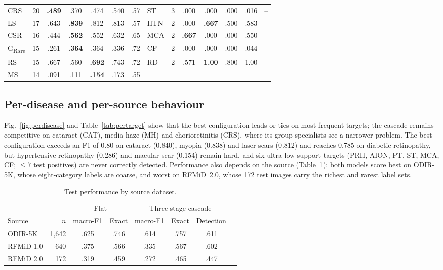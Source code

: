 \documentclass[conference]{IEEEtran}
\newcommand{\B}[1]{\textbf{#1}}
\newcommand{\grare}{G\textsubscript{Rare}}
\begin{document}
\begin{table}[t]
\begin{tabular}{@{}lrccccc|lrccccc@{}}
CRS & 20 & \B{.489} & .370 & .474 & .540 & .57 & ST & 3 & .000 & .000 & .000 & .016 & --\\
LS & 17 & .643 & \B{.839} & .812 & .813 & .57 & HTN & 2 & .000 & \B{.667} & .500 & .583 & --\\
CSR & 16 & .444 & \B{.562} & .552 & .632 & .65 & MCA & 2 & \B{.667} & .000 & .000 & .550 & --\\
\grare{} & 15 & .261 & \B{.364} & .364 & .336 & .72 & CF & 2 & .000 & .000 & .000 & .044 & --\\
RS & 15 & .667 & .560 & \B{.692} & .743 & .72 & RD & 2 & .571 & \B{1.00} & .800 & 1.00 & --\\
MS & 14 & .091 & .111 & \B{.154} & .173 & .55 & & & & & & &\\
\bottomrule
\end{tabular}
\end{table}

\subsection{Per-disease and per-source behaviour}
Fig.~\ref{fig:perdisease} and Table~\ref{tab:pertarget} show that the best configuration leads or ties on most
frequent targets; the cascade remains competitive on cataract (CAT), media haze (MH)
and chorioretinitis (CRS), where its group specialists see a narrower problem.
The best configuration exceeds an F1 of 0.80 on cataract (0.840), myopia (0.838) and
laser scars (0.812) and reaches 0.785 on diabetic retinopathy, but hypertensive
retinopathy (0.286) and macular scar (0.154) remain hard, and six ultra-low-support
targets (PRH, AION, PT, ST, MCA, CF; $\leq 7$ test positives) are never correctly detected.
Performance also depends on the source (Table~\ref{tab:source}): both models
score best on ODIR-5K, whose eight-category labels are coarse, and worst on
RFMiD~2.0, whose 172 test images carry the richest and rarest label sets.

\begin{table}[t]
\centering
\caption{Test performance by source dataset.}
\label{tab:source}
\setlength{\tabcolsep}{3.2pt}
\footnotesize
\begin{tabular}{@{}lrcccccc@{}}
\toprule
& & \multicolumn{2}{c}{Flat} & \multicolumn{3}{c}{Three-stage cascade}\\
\cmidrule(lr){3-4}\cmidrule(l){5-7}
Source & $n$ & macro-F1 & Exact & macro-F1 & Exact & Detection\\
\midrule
ODIR-5K & 1{,}642 & .625 & .746 & .614 & .757 & .611\\
RFMiD 1.0 & 640 & .375 & .566 & .335 & .567 & .602\\
RFMiD 2.0 & 172 & .319 & .459 & .272 & .465 & .447\\
\bottomrule
\end{tabular}
\end{table}
\end{document}
